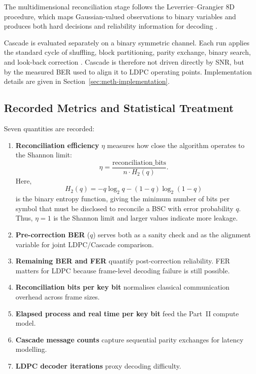 \documentclass{UoYCSproject}
\begin{document}
The multidimensional reconciliation stage follows the Leverrier--Grangier 8D
procedure, which maps Gaussian-valued observations to binary variables and
produces both hard decisions and reliability information for decoding
\cite{leverrier_multidimensional_2008}.

Cascade is evaluated separately on a binary symmetric channel. Each run applies
the standard cycle of shuffling, block partitioning, parity exchange, binary
search, and look-back correction \cite{martinez-mateo_demystifying_2015}. Cascade is therefore not driven directly by
SNR, but by the measured BER used to align it to LDPC operating points. 
Implementation details are given in Section~\ref{sec:meth-implementation}.

\subsection{Recorded Metrics and Statistical Treatment}
\label{subsec:meth-metrics}

Seven quantities are recorded:
\begin{enumerate}
    \item \textbf{Reconciliation efficiency} $\eta$ measures how close the
    algorithm operates to the Shannon limit:
    \begin{equation}
        \eta =
        \frac{\mathrm{reconciliation\_bits}}{n \cdot H_2(q)}.
    \end{equation}
    Here,
    \begin{equation}
        H_2(q) = -q\log_2 q - (1-q)\log_2(1-q)
    \end{equation}
    is the binary entropy function, giving the minimum number of bits per
    symbol that must be disclosed to reconcile a BSC with error probability
    $q$. Thus, $\eta = 1$ is the Shannon limit and larger values indicate
    more leakage.

    \item \textbf{Pre-correction BER} ($q$) serves both as a sanity check and
    as the alignment variable for joint LDPC/Cascade comparison.

    \item \textbf{Remaining BER and FER} quantify post-correction reliability.
    FER matters for LDPC because frame-level decoding failure is still
    possible.

    \item \textbf{Reconciliation bits per key bit} normalises classical
    communication overhead across frame sizes.

    \item \textbf{Elapsed process and real time per key bit} feed the Part~II
    compute model.

    \item \textbf{Cascade message counts} capture sequential parity exchanges
    for latency modelling.

    \item \textbf{LDPC decoder iterations} proxy decoding difficulty.
\end{enumerate}
\end{document}
